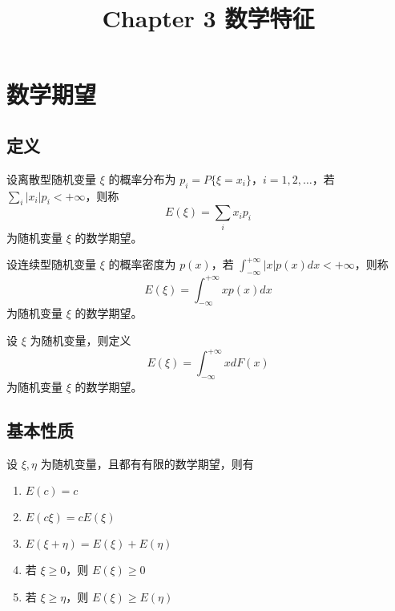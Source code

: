 \documentclass[12pt,a4paper]{amsart}
\title{Chapter 3 数学特征}
\begin{document}
\maketitle\cite{杨振明2007}

\section{数学期望}

\subsection{定义}

\begin{definition}[离散型随机变量的数学期望]
    设离散型随机变量 $\xi$ 的概率分布为 $p_i = P\{\xi = x_i\}$，$i = 1, 2, \ldots$，若 $\sum_{i} |x_i|p_i < +\infty$，则称
    \begin{equation}
        E(\xi) = \sum_{i} x_i p_i
    \end{equation}
    为随机变量 $\xi$ 的数学期望。
\end{definition}

\begin{definition}[连续型随机变量的数学期望]
    设连续型随机变量 $\xi$ 的概率密度为 $p(x)$，若 $\int_{-\infty}^{+\infty} |x|p(x) dx < +\infty$，则称
    \begin{equation}
        E(\xi) = \int_{-\infty}^{+\infty} x p(x) dx
    \end{equation}
    为随机变量 $\xi$ 的数学期望。
\end{definition}

\begin{definition}[数学期望的统一写法]
    设 $\xi$ 为随机变量，则定义
    \begin{equation}
        E(\xi) = \int_{-\infty}^{+\infty} x dF(x)
    \end{equation}
    为随机变量 $\xi$ 的数学期望。
\end{definition}

\subsection{基本性质}

\begin{proposition}[数学期望的性质]
    设 $\xi, \eta$ 为随机变量，且都有有限的数学期望，则有
    \begin{enumerate}
        \item $E(c) = c$
        \item $E(c\xi) = cE(\xi)$
        \item $E(\xi + \eta) = E(\xi) + E(\eta)$
        \item 若 $\xi \geq 0$，则 $E(\xi) \geq 0$
        \item 若 $\xi \geq \eta$，则 $E(\xi) \geq E(\eta)$
    \end{enumerate}
\end{proposition}
\end{document}
